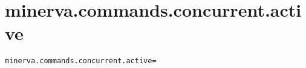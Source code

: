\section{minerva.commands.concurrent.active}
\label{configuration:MinervaCommandsConcurrentActive}
\ClearAPI
\TODO
\begin{lstlisting}[style=Props,caption={Usage example for \textit{minerva.commands.concurrent.active}}]
minerva.commands.concurrent.active=
\end{lstlisting}